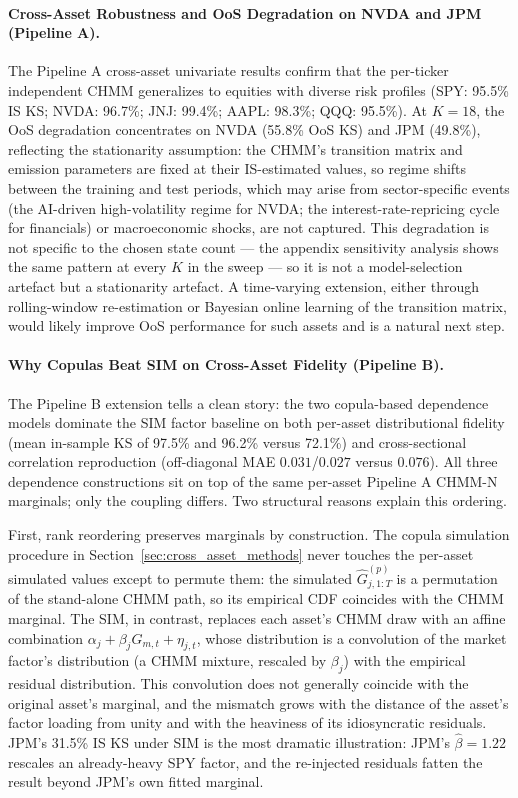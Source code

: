 \paragraph{Cross-Asset Robustness and OoS Degradation on NVDA and JPM (Pipeline A).}
The Pipeline A cross-asset univariate results confirm that the per-ticker independent CHMM generalizes to equities with diverse risk profiles (SPY: 95.5\% IS KS; NVDA: 96.7\%; JNJ: 99.4\%; AAPL: 98.3\%; QQQ: 95.5\%).
At $K = 18$, the OoS degradation concentrates on NVDA (55.8\% OoS KS) and JPM (49.8\%), reflecting the stationarity assumption: the CHMM's transition matrix and emission parameters are fixed at their IS-estimated values, so regime shifts between the training and test periods, which may arise from sector-specific events (the AI-driven high-volatility regime for NVDA; the interest-rate-repricing cycle for financials) or macroeconomic shocks, are not captured.
This degradation is not specific to the chosen state count --- the appendix sensitivity analysis shows the same pattern at every $K$ in the sweep --- so it is not a model-selection artefact but a stationarity artefact.
A time-varying extension, either through rolling-window re-estimation or Bayesian online learning of the transition matrix, would likely improve OoS performance for such assets and is a natural next step.

\paragraph{Why Copulas Beat SIM on Cross-Asset Fidelity (Pipeline B).}
The Pipeline B extension tells a clean story: the two copula-based dependence models dominate the SIM factor baseline on both per-asset distributional fidelity (mean in-sample KS of 97.5\% and 96.2\% versus 72.1\%) and cross-sectional correlation reproduction (off-diagonal MAE $0.031$/$0.027$ versus $0.076$). All three dependence constructions sit on top of the same per-asset Pipeline A CHMM-N marginals; only the coupling differs.
Two structural reasons explain this ordering.

First, rank reordering preserves marginals by construction.
The copula simulation procedure in Section~\ref{sec:cross_asset_methods} never touches the per-asset simulated values except to permute them: the simulated $\hat{G}_{j,1:T}^{(p)}$ is a permutation of the stand-alone CHMM path, so its empirical CDF coincides with the CHMM marginal.
The SIM, in contrast, replaces each asset's CHMM draw with an affine combination $\alpha_j + \beta_j G_{m,t} + \eta_{j,t}$, whose distribution is a convolution of the market factor's distribution (a CHMM mixture, rescaled by $\beta_j$) with the empirical residual distribution.
This convolution does not generally coincide with the original asset's marginal, and the mismatch grows with the distance of the asset's factor loading from unity and with the heaviness of its idiosyncratic residuals.
JPM's 31.5\% IS KS under SIM is the most dramatic illustration: JPM's $\hat{\beta} = 1.22$ rescales an already-heavy SPY factor, and the re-injected residuals fatten the result beyond JPM's own fitted marginal.

